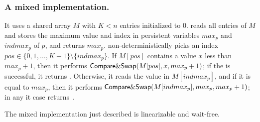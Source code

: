 \begin{figure}[ht!]
\end{figure}

\subsubsection{A mixed implementation.}
It uses a shared array $M$ with $K < n$ entries initialized to 0.  \LL reads all entries of $M$ and stores the maximum value and index in persistent variables $max_p$ and $indmax_p$ of $p$, and returns $max_p$.  \IC non-deterministically picks an index $pos \in \{0,1,\hdots,K-1\} \setminus \{indmax_p\}$.  If $M[pos]$ contains a value $x$ less than $max_p+1$, then it performs ${\sf Compare\&Swap}(M[pos], x, max_p+1)$; if the \CAS is successful, it returns \ok. Otherwise, it reads the value in $M[indmax_p]$, and if it is equal to $max_p$, then it performs ${\sf Compare\&Swap}(M[indmax_p], max_p, max_p+1)$; in any it case returns~\ok.

\begin{theorem}
\label{theorem:mixed-ll-ic}
  The mixed implementation just described is linearizable and wait-free.
\end{theorem}

